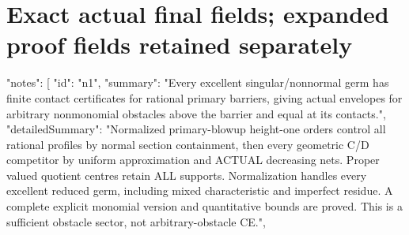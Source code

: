 \documentclass[11pt]{article}
\begin{document}
\section{Exact actual final fields; expanded proof fields retained separately}
\begin{ActualFinalDATA}
{
  "notes": [
    {
      "id": "n1",
      "summary": "Every excellent singular/nonnormal germ has finite contact certificates for rational primary barriers, giving actual envelopes for arbitrary nonmonomial obstacles above the barrier and equal at its contacts.",
      "detailedSummary": "Normalized primary-blowup height-one orders control all rational profiles by normal section containment, then every geometric C/D competitor by uniform approximation and ACTUAL decreasing nets. Proper valued quotient centres retain ALL supports. Normalization handles every excellent reduced germ, including mixed characteristic and imperfect residue. A complete explicit monomial version and quantitative bounds are proved. This is a sufficient obstacle sector, not arbitrary-obstacle CE.",
}}
\end{ActualFinalDATA}
\end{document}
